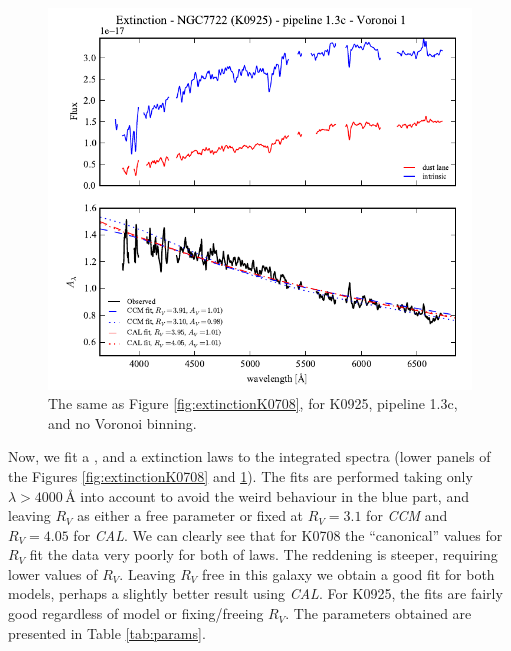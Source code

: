 \documentclass[a4paper]{article}
\newcommand{\angstrom}{\text{\AA}}
\def\CCM{\textit{CCM}\xspace}
\def\CAL{\textit{CAL}\xspace}
\begin{document}
\begin{figure}
\includegraphics{figures/spectra_K0925_1.3c_v01.pdf}
\caption{The same as Figure \ref{fig:extinctionK0708}, for K0925, pipeline 1.3c, and
no Voronoi binning.}
\label{fig:extinctionK0925}
\end{figure}

Now, we fit a \citet*[hereafter \CCM, blue in the $A_\lambda$
plots]{CCM1989}, and a \citet*[hereafter \CAL, red in the $A_\lambda$
plots]{Calzetti1994} extinction laws to the integrated spectra (lower
panels of the Figures \ref{fig:extinctionK0708} and
\ref{fig:extinctionK0925}). The fits are performed taking only
$\lambda > 4000\,\angstrom$ into account to avoid the weird behaviour
in the blue part, and leaving $R_V$ as either a free parameter or
fixed at $R_V = 3.1$ for \CCM and $R_V = 4.05$ for \CAL. We can
clearly see that for K0708 the ``canonical'' values for $R_V$ fit the
data very poorly for both of laws. The reddening is steeper,
requiring lower values of $R_V$.  Leaving $R_V$ free in this galaxy we
obtain a good fit for both models, perhaps a slightly better result
using \CAL. For K0925, the fits are fairly good regardless of model or
fixing/freeing $R_V$. The parameters obtained are presented in Table
\ref{tab:params}.
\end{document}

